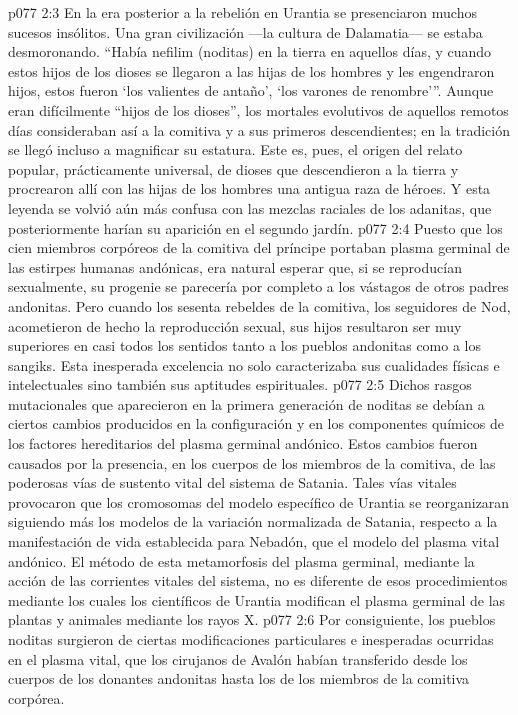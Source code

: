 \vs p077 2:3 En la era posterior a la rebelión en Urantia se presenciaron muchos sucesos insólitos. Una gran civilización ---la cultura de Dalamatia--- se estaba desmoronando. “Había nefilim (noditas) en la tierra en aquellos días, y cuando estos hijos de los dioses se llegaron a las hijas de los hombres y les engendraron hijos, estos fueron ‘los valientes de antaño', ‘los varones de renombre'”. Aunque eran difícilmente “hijos de los dioses”, los mortales evolutivos de aquellos remotos días consideraban así a la comitiva y a sus primeros descendientes; en la tradición se llegó incluso a magnificar su estatura. Este es, pues, el origen del relato popular, prácticamente universal, de dioses que descendieron a la tierra y procrearon allí con las hijas de los hombres una antigua raza de héroes. Y esta leyenda se volvió aún más confusa con las mezclas raciales de los adanitas, que posteriormente harían su aparición en el segundo jardín.
\vs p077 2:4 Puesto que los cien miembros corpóreos de la comitiva del príncipe portaban plasma germinal de las estirpes humanas andónicas, era natural esperar que, si se reproducían sexualmente, su progenie se parecería por completo a los vástagos de otros padres andonitas. Pero cuando los sesenta rebeldes de la comitiva, los seguidores de Nod, acometieron de hecho la reproducción sexual, sus hijos resultaron ser muy superiores en casi todos los sentidos tanto a los pueblos andonitas como a los sangiks. Esta inesperada excelencia no solo caracterizaba sus cualidades físicas e intelectuales sino también sus aptitudes espirituales.
\vs p077 2:5 Dichos rasgos mutacionales que aparecieron en la primera generación de noditas se debían a ciertos cambios producidos en la configuración y en los componentes químicos de los factores hereditarios del plasma germinal andónico. Estos cambios fueron causados por la presencia, en los cuerpos de los miembros de la comitiva, de las poderosas vías de sustento vital del sistema de Satania. Tales vías vitales provocaron que los cromosomas del modelo específico de Urantia se reorganizaran siguiendo más los modelos de la variación normalizada de Satania, respecto a la manifestación de vida establecida para Nebadón, que el modelo del plasma vital andónico. El método de esta metamorfosis del plasma germinal, mediante la acción de las corrientes vitales del sistema, no es diferente de esos procedimientos mediante los cuales los científicos de Urantia modifican el plasma germinal de las plantas y animales mediante los rayos X.
\vs p077 2:6 Por consiguiente, los pueblos noditas surgieron de ciertas modificaciones particulares e inesperadas ocurridas en el plasma vital, que los cirujanos de Avalón habían transferido desde los cuerpos de los donantes andonitas hasta los de los miembros de la comitiva corpórea.
